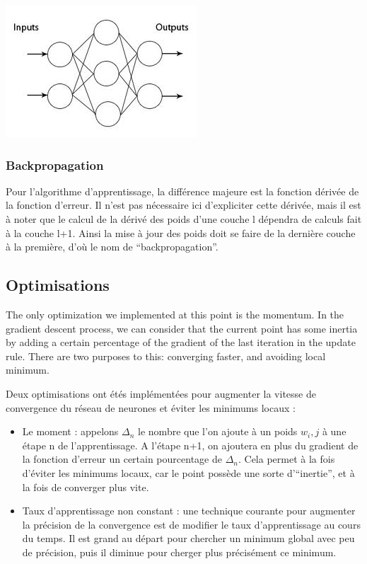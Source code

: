 \begin{center}
\includegraphics[scale=0.7]{chapters/Pictures/mlffnn.jpg}\\
\end{center}

\subsubsection{Backpropagation}
Pour l'algorithme d'apprentissage, la différence majeure est la fonction dérivée de la fonction d'erreur. Il n'est pas nécessaire ici d'expliciter cette dérivée, mais il est à noter que le calcul de la dérivé des poids d'une couche l dépendra de calculs fait à la couche l+1. Ainsi la mise à jour des poids doit se faire de la dernière couche à la première, d'où le nom de ``backpropagation''.

\subsection{Optimisations}

The only optimization we implemented at this point is the momentum. In the
gradient descent process, we can consider that the current point has some
inertia by adding a certain percentage of the gradient of the last iteration in
the update rule. There are two purposes to this: converging faster, and avoiding
local minimum.

Deux optimisations ont étés implémentées pour augmenter la vitesse de convergence du réseau de neurones et éviter les minimums locaux :
\begin{itemize}
  \item Le moment : appelons $\Delta_n$ le nombre que l'on ajoute à un poids $w_i,j$ à une étape n de l'apprentissage. A l'étape n+1, on ajoutera en plus du gradient de la fonction d'erreur un certain pourcentage de $\Delta_n$. Cela permet à la fois d'éviter les minimums locaux, car le point possède une sorte d'``inertie'', et à la fois de converger plus vite.
  \item Taux d'apprentissage non constant : une technique courante pour augmenter la précision de la convergence est de modifier le taux d'apprentissage au cours du temps. Il est grand au départ pour chercher un minimum global avec peu de précision, puis il diminue pour cherger plus précisément ce minimum.
\end{itemize}

